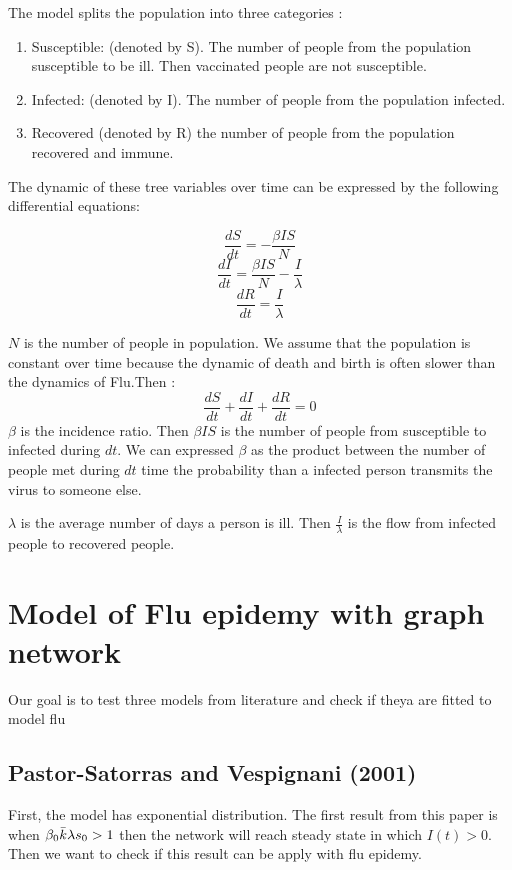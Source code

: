 The model splits the population into three categories : 
\begin{enumerate}
    \item Susceptible: (denoted by S). The number of people from the population susceptible to be ill. Then vaccinated people are not susceptible.
    \item Infected: (denoted by I). The number of people from the population infected.
    \item Recovered (denoted by R) the number of people from the population recovered and immune.
    
\end{enumerate}

The dynamic of these tree variables over time can be expressed by the following differential equations:

$${\frac  {dS}{dt}}=-{\frac  {\beta IS}{N}}$$
$${\frac  {dI}{dt}}={\frac  {\beta IS}{N}}-\frac{I}{\lambda}$$
$${\frac  {dR}{dt}}=\frac{I}{\lambda}$$

$N$ is the number of people in population. We assume that the population is constant over time because the dynamic of death and birth is often slower than the dynamics of Flu.Then :
$${\frac  {dS}{dt}}+{\frac  {dI}{dt}}+{\frac  {dR}{dt}}=0$$
$\beta$ is the incidence ratio. Then $\beta I S$ is the number of people from susceptible to infected during $dt$. We can expressed $\beta$ as the product between the number of people met during $dt$ time the probability than a infected person transmits the virus to someone else.


$\lambda$ is the average number of days a person is ill. Then $\frac{I}{\lambda}$ is the flow from infected people to recovered people.


\section{Model of Flu epidemy with graph network}

Our goal is to test three models from literature and check if theya are fitted to model flu

\subsection{Pastor-Satorras and Vespignani (2001) \cite{PhysRevLett.86.3200}}

First, the model has exponential distribution.
The first result from this paper is when $\beta_{0} \Bar{k} \lambda s_0>1$ then the network will reach steady state in which $I(t) > 0$. Then we want to check if this result can be apply with flu epidemy.

